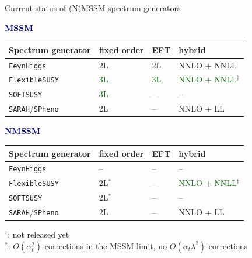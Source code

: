 \documentclass[hyperref={pdfpagelabels=false},ngerman]{beamer}
\renewcommand{\emph}[1]{\textbf{\textcolor{darkblue}{#1}}}
\newcommand{\FS}{\texttt{FlexibleSUSY}\xspace}
\newcommand{\FH}{\texttt{FeynHiggs}\xspace}
\newcommand{\SPheno}{\texttt{SPheno}\xspace}
\newcommand{\SARAH}{\texttt{SARAH}\xspace}
\newcommand{\SOFTSUSY}{\texttt{SOFTSUSY}\xspace}
\newcommand{\at}{\alpha_t}
\begin{document}

\begin{frame}[noframenumbering]{Current status of (N)MSSM spectrum generators}
  \begin{center}
    \emph{MSSM}\\[0.4em]
    \begin{tabular}{llll}
      \toprule
      Spectrum generator & fixed order & EFT & hybrid \\
      \midrule
      \FH                & 2L & 2L & NNLO + NNLL \\
      \FS                & \textcolor{darkgreen}{3L} & \textcolor{darkgreen}{3L} & \textcolor{darkgreen}{NNLO + NNLL}$^\dagger$ \\
      \SOFTSUSY          & \textcolor{darkgreen}{3L} & -- & -- \\
      \SARAH/\SPheno     & 2L & -- & NNLO + LL \\
      \bottomrule
    \end{tabular}
  \end{center}
  \begin{center}
    \emph{NMSSM}\\[0.4em]
    \begin{tabular}{llll}
      \toprule
      Spectrum generator & fixed order & EFT & hybrid \\
      \midrule
      \FH                & -- & -- & -- \\
      \FS                & 2L$^*$ & -- & \textcolor{darkgreen}{NNLO + NNLL}$^\dagger$ \\
      \SOFTSUSY          & 2L$^*$ & -- & -- \\
      \SARAH/\SPheno     & 2L & -- & NNLO + LL \\
      \bottomrule
    \end{tabular}
  \end{center}
  $^\dagger$: not released yet\\
  $^*$: $O(\at^2)$ corrections in the MSSM limit, no $O(\at\lambda^2)$ corrections
\end{frame}

\end{document}
